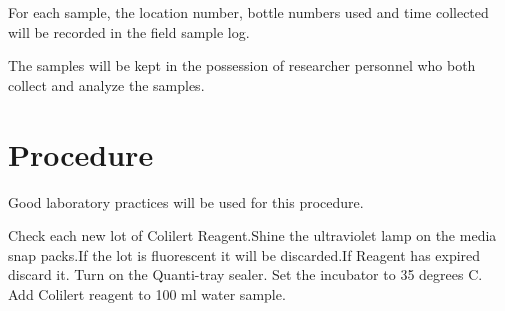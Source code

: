 \documentclass[12pt]{../SOP4_alpha}\usepackage[]{graphicx}\usepackage[]{xcolor}
\begin{document}
\NP For each sample, the location number, bottle numbers used and time
collected will be recorded in the field sample log.

\NP The samples will be kept in the possession of researcher personnel who both
collect and analyze the samples.










\section{Procedure}

Good laboratory practices will be used for this procedure.

\NP Check each new lot of Colilert Reagent.Shine the ultraviolet lamp on the media snap packs.If the lot is fluorescent it will be discarded.If Reagent has expired discard it.
\NP Turn on the Quanti-tray sealer. 
\NP Set the incubator to 35 degrees C.
\NP Add Colilert reagent to 100 ml water sample.
\end{document}
